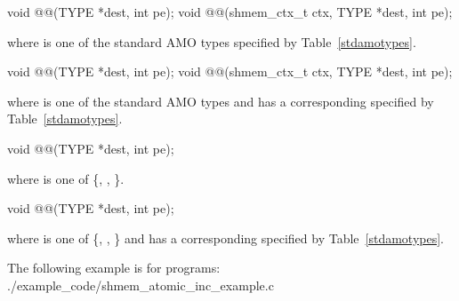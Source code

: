 
\begin{apidefinition}

\begin{C11synopsis}
void @@(TYPE *dest, int pe);
void @@(shmem_ctx_t ctx, TYPE *dest, int pe);
\end{C11synopsis}
where \TYPE{} is one of the standard \ac{AMO} types specified by
Table~\ref{stdamotypes}.

\begin{Csynopsis}
void @@(TYPE *dest, int pe);
void @@(shmem_ctx_t ctx, TYPE *dest, int pe);
\end{Csynopsis}
where \TYPE{} is one of the standard \ac{AMO} types and has a corresponding
\TYPENAME{} specified by Table~\ref{stdamotypes}.

\begin{DeprecateBlock}
\begin{C11synopsis}
void @@(TYPE *dest, int pe);
\end{C11synopsis}
where \TYPE{} is one of \{, , \}.

\begin{Csynopsis}
void @@(TYPE *dest, int pe);
\end{Csynopsis}
where \TYPE{} is one of \{, , \}
and has a corresponding \TYPENAME{} specified by Table~\ref{stdamotypes}.
\end{DeprecateBlock}

\begin{apiarguments}


\end{apiarguments}



\begin{apiexamples}

\apicexample
    { The following  example is for
    \Cstd[11] programs: }
    {./example_code/shmem_atomic_inc_example.c}
    {}

\end{apiexamples}

\end{apidefinition}
